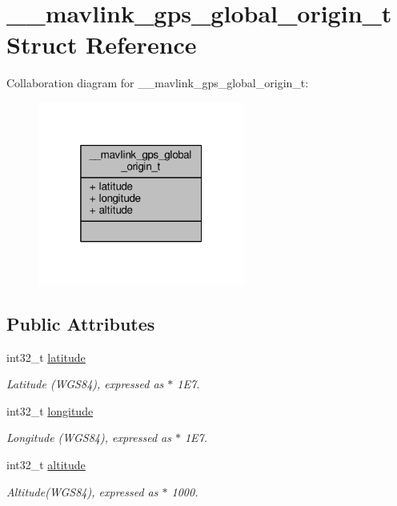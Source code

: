 \hypertarget{struct____mavlink__gps__global__origin__t}{\section{\+\_\+\+\_\+mavlink\+\_\+gps\+\_\+global\+\_\+origin\+\_\+t Struct Reference}
\label{struct____mavlink__gps__global__origin__t}
}


Collaboration diagram for \+\_\+\+\_\+mavlink\+\_\+gps\+\_\+global\+\_\+origin\+\_\+t\+:
\nopagebreak
\begin{figure}[H]
\begin{center}
\leavevmode
\includegraphics[width=193pt]{struct____mavlink__gps__global__origin__t__coll__graph}
\end{center}
\end{figure}
\subsection*{Public Attributes}
\begin{DoxyCompactItemize}
\item 
int32\+\_\+t \hyperlink{struct____mavlink__gps__global__origin__t_ab78807fb15062419bf5452c3294235bc}{latitude}
\begin{DoxyCompactList}\small\item\em Latitude (W\+G\+S84), expressed as $\ast$ 1\+E7. \end{DoxyCompactList}\item 
int32\+\_\+t \hyperlink{struct____mavlink__gps__global__origin__t_a52156dc446e0be0bc5cbf4247e194349}{longitude}
\begin{DoxyCompactList}\small\item\em Longitude (W\+G\+S84), expressed as $\ast$ 1\+E7. \end{DoxyCompactList}\item 
int32\+\_\+t \hyperlink{struct____mavlink__gps__global__origin__t_a34577699f6c0ef2517eb8b16da733c15}{altitude}
\begin{DoxyCompactList}\small\item\em Altitude(\+W\+G\+S84), expressed as $\ast$ 1000. \end{DoxyCompactList}\end{DoxyCompactItemize}


